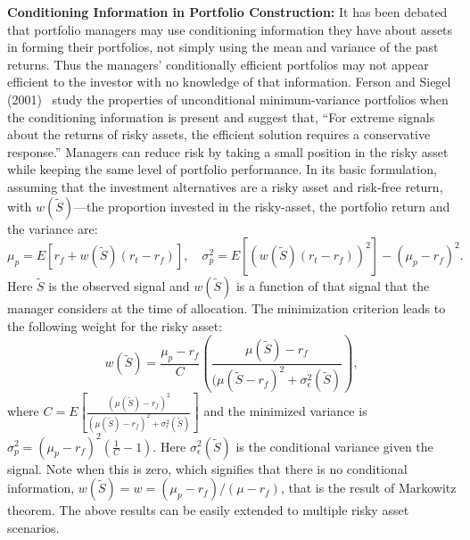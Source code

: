 \noindent\textbf{Conditioning Information in Portfolio Construction:} It has been debated that portfolio managers may use conditioning information they have about assets in forming their portfolios, not simply using the mean and variance of the past returns. Thus the managers' conditionally efficient portfolios may not appear efficient to the investor with no knowledge of that information. Ferson and Siegel (2001)~\cite{fersie} study the properties of unconditional minimum-variance portfolios when the conditioning information is present and suggest that, ``For extreme signals about the returns of risky assets, the efficient solution requires a conservative response.'' Managers can reduce risk by taking a small position in the risky asset while keeping the same level of portfolio performance. In its basic formulation, assuming that the investment alternatives are a risky asset and risk-free return, with $w(\tilde{S})$---the proportion invested in the risky-asset, the portfolio return and the variance are: 
	\begin{equation} \label{eqn:preturnvar}
	\mu_p= E[r_f+w(\tilde{S})(r_t-r_f)], \quad \sigma_p^2= E[(w(\tilde{S})(r_t - r_f))^2] - (\mu_p - r_f)^2.
	\end{equation}
Here $\tilde{S}$ is the observed signal and $w(\tilde{S})$ is a function of that signal that the manager considers at the time of allocation. The minimization criterion leads to the following weight for the risky asset:
	\begin{equation} \label{eqn:riskyassetweight}
	w(\tilde{S})= \dfrac{\mu_p - r_f}{C} \left( \dfrac{\mu(\tilde{S}) - r_f}{(\mu(\tilde{S} - r_f)^2 + \sigma^2_\epsilon(\tilde{S})} \right),
	\end{equation}
where $C= E\left[ \frac{(\mu(\tilde{S}) - r_f)^2}{(\mu(\tilde{S}) - r_f)^2 + \sigma^2_\epsilon(\tilde{S})} \right]$ and the minimized variance is ${\sigma_p^2=(\mu_p - r_f)^2 \left( \frac{1}{C} - 1 \right)}$. Here $\sigma_\epsilon^2(\tilde{S})$ is the conditional variance given the signal. Note when this is zero, which signifies that there is no conditional information, $w(\tilde{S})= w= (\mu_p - r_f)/(\mu - r_f)$, that is the result of Markowitz theorem. The above results can be easily extended to multiple risky asset scenarios.


